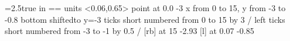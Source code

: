%
\xfiglen=2.5true in
\setbox\figuretwo=\vbox{\hsize=\xfiglen
\beginpicture
\small
  \setcoordinatesystem units <0.06\xfiglen,0.65\yfiglen>  point at 0.0 -3
\scriptsize
  \setplotarea x from 0 to 15, y from -3 to -0.8
  \axis bottom shiftedto y=-3 ticks short numbered from 0 to 15 by 3 /
  \axis left ticks short numbered from -3 to -1 by 0.5 /
\footnotesize
{} [rb] at 15 -2.93
 [l] at 0.07 -0.85
%
\setquadratic
\setsolid
\Black{  %

}\relax
\setdots <2pt>
\Red{\relax   %

}\relax
%
\setdashes
\OliveGreen{\relax   %

}\relax
%
\endpicture
}
%


